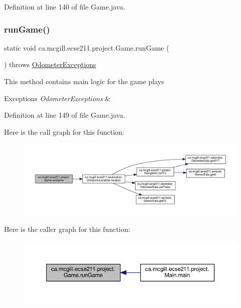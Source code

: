 Definition at line 140 of file Game.\+java.

\mbox{\label{classca_1_1mcgill_1_1ecse211_1_1project_1_1_game_afaee4e6015d5219e948a055067261de6}} 
\subsubsection{\texorpdfstring{run\+Game()}{runGame()}}
{\footnotesize\ttfamily static void ca.\+mcgill.\+ecse211.\+project.\+Game.\+run\+Game (\begin{DoxyParamCaption}{ }\end{DoxyParamCaption}) throws \hyperlink{classca_1_1mcgill_1_1ecse211_1_1odometer_1_1_odometer_exceptions}{Odometer\+Exceptions}\hspace{0.3cm}{\ttfamily [static]}}

This method contains main logic for the game plays


\begin{DoxyExceptions}{Exceptions}
{\em Odometer\+Exceptions} & \\
\hline
\end{DoxyExceptions}


Definition at line 149 of file Game.\+java.

Here is the call graph for this function\+:
\nopagebreak
\begin{figure}[H]
\begin{center}
\leavevmode
\includegraphics[width=350pt]{classca_1_1mcgill_1_1ecse211_1_1project_1_1_game_afaee4e6015d5219e948a055067261de6_cgraph}
\end{center}
\end{figure}
Here is the caller graph for this function\+:
\nopagebreak
\begin{figure}[H]
\begin{center}
\leavevmode
\includegraphics[width=350pt]{classca_1_1mcgill_1_1ecse211_1_1project_1_1_game_afaee4e6015d5219e948a055067261de6_icgraph}
\end{center}
\end{figure}


